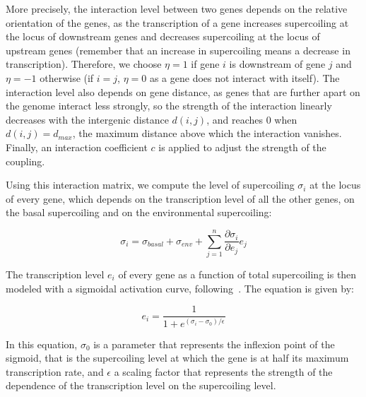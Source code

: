More precisely, the interaction level between two genes depends on the relative orientation of the genes, as the transcription of a gene increases supercoiling at the locus of downstream genes and decreases supercoiling at the locus of upstream genes (remember that an increase in supercoiling means a decrease in transcription).
Therefore, we choose $\eta = 1$ if gene $i$ is downstream of gene $j$ and $\eta = -1$ otherwise (if $i=j$, $\eta = 0$ as a gene does not interact with itself).
The interaction level also depends on gene distance, as genes that are further apart on the genome interact less strongly, so the strength of the interaction linearly decreases with the intergenic distance $d(i, j)$, and reaches 0 when $d(i, j) = d_{max}$, the maximum distance above which the interaction vanishes.
Finally, an interaction coefficient $c$ is applied to adjust the strength of the coupling.

Using this interaction matrix, we compute the level of supercoiling $\sigma_i$ at the locus of every gene, which depends on the transcription level of all the other genes, on the basal supercoiling and on the environmental supercoiling:

\begin{equation}
  \sigma_i = \sigma_{basal} + \sigma_{env} + \sum_{j=1}^n\frac{\partial\sigma_{i}}{\partial e_j}e_j
  \label{eq:alife_sigma}
\end{equation}

The transcription level $e_i$ of every gene as a function of total supercoiling is then modeled with a sigmoidal activation curve, following~\cite{elhoudaigui2019}.
The equation is given by:

\begin{equation}
  e_i = \frac{1}{1 + e^{(\sigma_i - \sigma_0)/\epsilon}}
  \label{eq:transcr}
\end{equation}

In this equation, $\sigma_0$ is a parameter that represents the inflexion point of the sigmoid, that is the supercoiling level at which the gene is at half its maximum transcription rate, and $\epsilon$ a scaling factor that represents the strength of the dependence of the transcription level on the supercoiling level.

